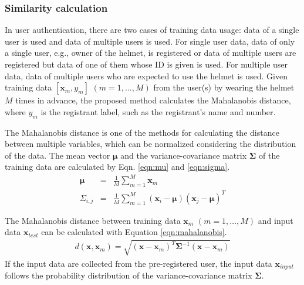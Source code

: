\documentclass[sigchi,authordraft]{acmart}
\begin{document}
\subsubsection{Similarity calculation}
In user authentication, there are two cases of training data usage: data of a single user is used and data of multiple users is used. 
For single user data, data of only a single user, e.g., owner of the helmet, is registered or data of multiple users are registered but data of one of them whose ID is given is used. For multiple user data, data of multiple users who are expected to use the helmet is used. Given training data $[\bm{x}_m,y_m]$ $(m=1,\dots, M)$ from the user(s) by wearing the helmet $M$ times in advance, the proposed method calculates the Mahalanobis distance, where $y_m$ is the registrant label, such as the registrant's name and number. 

The Mahalanobis distance is one of the methods for calculating the distance between multiple variables, which can be normalized considering the distribution of the data.
The mean vector $\bm{\mu}$ and the variance-covariance matrix $\bm{\Sigma}$ of the training data are calculated by Eqn. \ref{eqn:mu} and \ref{eqn:sigma}.
\begin{eqnarray}
\label{eqn:mu}
  \bm{\mu} &=& \frac{1}{M}\sum_{m=1}^{M}\bm{x}_m \\
\label{eqn:sigma}
  \Sigma_{i,j} &=& \frac{1}{M}\sum_{m=1}^{M}(\bm{x}_i-\bm{\mu})(\bm{x}_j-\bm{\mu})^T
\end{eqnarray}

The Mahalanobis distance between training data $\bm{x}_m$ $(m=1,\dots, M)$ and input data $\bm{x}_{test}$ can be calculated with Equation \ref{eqn:mahalanobis}.
\begin{eqnarray}
\label{eqn:mahalanobis}
  d(\bm{x},\bm{x}_m) = \sqrt{(\bm{x}-\bm{x}_m)^{T}\bm{\Sigma}^{-1}(\bm{x}-\bm{x}_m)}
\end{eqnarray}
If the input data are collected from the pre-registered user, the input data $\bm{x}_{input}$ follows the probability distribution of the variance-covariance matrix $\bm{\Sigma}$.
\end{document}

